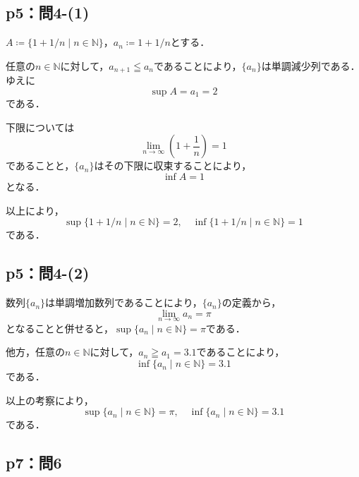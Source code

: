 \documentclass[uplatex,dvipdfmx,a4paper,10pt,fleqn]{jsarticle}
\begin{document}
    \subsection*{p5：問4-(1)}

    \begin{tleftbar}
        $A \coloneqq \{ 1 + 1/n \mid n \in \mathbb{N} \}$，$ a_n \coloneqq 1+1/n$とする．

        任意の$n \in \mathbb{N}$に対して，$a_{n+1} \leqq a_n$であることにより，$\{ a_n \}$は単調減少列である．ゆえに
        \[
            \sup A = a_1 = 2
        \]
        である．
        
        下限については
        \[
            \lim_{n \to \infty} \left ( 1 + \frac{1}{n} \right) = 1
        \]
        であることと，$\{ a_n \}$はその下限に収束することにより，
        \[
            \inf A = 1 
        \]
        となる．
        
        以上により，
        \[
            \sup \{ 1 + 1/n \mid n \in \mathbb{N} \} = 2 , \quad \inf \{ 1 + 1/n \mid n \in \mathbb{N} \}=1
        \]
        である．
    \end{tleftbar}


    \subsection*{p5：問4-(2)}

    \begin{tleftbar}
        数列$\{ a_n \}$は単調増加数列であることにより，$\{ a_n \}$の定義から，
        \[
            \lim_{n \to \infty} a_n = \pi 
        \]
        となることと併せると，$\sup \{ a_n \mid n \in \mathbb{N} \} = \pi$である．
        
        他方，任意の$n \in \mathbb{N}$に対して，$ a_n \geqq a_1 = 3.1$であることにより，
        \[
            \inf \{ a_n \mid n \in \mathbb{N} \} =3.1
        \]
        である．

        以上の考察により，
        \[
            \sup \{ a_n \mid n \in \mathbb{N} \} = \pi,\quad    \inf \{ a_n \mid n \in \mathbb{N} \} =3.1
        \]
        である．
    \end{tleftbar}




    \subsection*{p7：問6}
\end{document}
